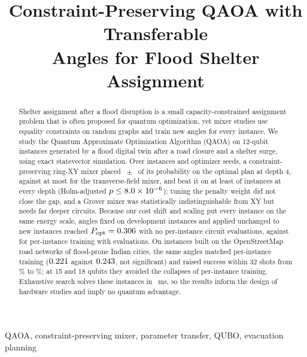 \documentclass[conference]{IEEEtran}
\begin{document}
\title{Constraint-Preserving QAOA with Transferable\\
Angles for Flood Shelter Assignment}

\author{
}

\maketitle

\begin{abstract}
Shelter assignment after a flood disruption is a small capacity-constrained assignment problem that is often proposed for quantum optimization, yet mixer studies use equality constraints on random graphs and train new angles for every instance. We study the Quantum Approximate Optimization Algorithm (QAOA) on 12-qubit instances generated by a flood digital twin after a road closure and a shelter surge, using exact statevector simulation. Over \NPaired{} instances and \NSeeds{} optimizer seeds, a constraint-preserving ring-XY mixer placed \SeedXYMean{}~$\pm$~\SeedXYSd{} of its probability on the optimal plan at depth 4, against at most \SeedXMax{} for the transverse-field mixer, and beat it on at least \StXYvXWinsMin{} of \NPaired{} instances at every depth (Holm-adjusted $p\le8.0\times10^{-6}$); tuning the penalty weight did not close the gap, and a Grover mixer was statistically indistinguishable from XY but needs far deeper circuits. Because our cost shift and scaling put every instance on the same energy scale, angles fixed on \NPaired{} development instances and applied unchanged to \HoN{} new instances reached $P_{\mathrm{opt}}=0.306$ with no per-instance circuit evaluations, against \HoTrainedFour{} for per-instance training with \HoCumFour{} evaluations. On \CityN{} instances built on the OpenStreetMap road networks of \CityNCities{} flood-prone Indian cities, the same angles matched per-instance training ($0.221$ against $0.243$, not significant) and raised success within 32 shots from \CitySuccTrained\% to \CitySuccFixed\%; at 15 and 18 qubits they avoided the collapses of per-instance training. Exhaustive search solves these instances in \ExactMs~ms, so the results inform the design of hardware studies and imply no quantum advantage.
\end{abstract}

\begin{IEEEkeywords}
QAOA, constraint-preserving mixer, parameter transfer, QUBO, evacuation planning
\end{IEEEkeywords}
\end{document}
